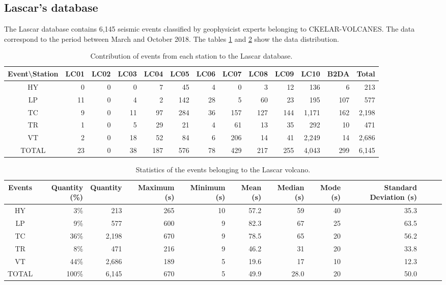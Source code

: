 \documentclass[journal]{IEEEtran}
\begin{document}
\subsection{Lascar's database}
The Lascar database contains 6,145 seismic events classified by geophysicist experts belonging to CKELAR-VOLCANES. The data correspond to the period between March and October 2018. The tables \ref{table:lascar_database} and \ref{table:lascar_statistics} show the data distribution.
\begin{table}
\caption{Contribution of events from each station to the Lascar database.}
\centering
\begin{adjustbox}{width=\textwidth}
\begin{tabular}{crrrrrrrrrrrr}
\hline\hline
Event\textbackslash{}Station & LC01 & LC02 & LC03 & LC04 & LC05 & LC06 & LC07 & LC08 & LC09 & LC10 & B2DA & Total \\
\hline
HY & 0 & 0 & 0 & 7 & 45 & 4 & 0 & 3 & 12 & 136 & 6 & 213 \\
LP & 11 & 0 & 4 & 2 & 142 & 28 & 5 & 60 & 23 & 195 & 107 & 577 \\
TC & 9 & 0 & 11 & 97 & 284 & 36 & 157 & 127 & 144 & 1,171 & 162 & 2,198 \\
TR & 1 & 0 & 5 & 29 & 21 & 4 & 61 & 13 & 35 & 292 & 10 & 471 \\
VT & 2 & 0 & 18 & 52 & 84 & 6 & 206 & 14 & 41 & 2,249 & 14 & 2,686 \\
\hline
TOTAL & 23 & 0 & 38 & 187 & 576 & 78 & 429 & 217 & 255 & 4,043 & 299 & 6,145 \\
\hline
\end{tabular}
\end{adjustbox}
\label{table:lascar_database}
\end{table}

\begin{table}
\caption{Statistics of the events belonging to the Lascar volcano.}
\centering
\begin{tabular}{crrrrrrrrrrr}
\hline\hline
  Events & Quantity (\%) & Quantity & Maximum (s) & Minimum (s) & Mean (s) & Median (s) & Mode (s) & Standard Deviation (s)  \\
\hline
HY & 3\% & 213 & 265 & 10 & 57.2 & 59 & 40 & 35.3 \\
LP & 9\% & 577 & 600 & 9 & 82.3 & 67 & 25 & 63.5 \\
TC & 36\% & 2,198 & 670 & 9 & 78.5 & 65 & 20 & 56.2 \\
TR & 8\% & 471 & 216 & 9 & 46.2 & 31 & 20 & 33.8 \\
VT & 44\% & 2,686 & 189 & 5 & 19.6 & 17 & 10 & 12.3 \\
\hline
TOTAL & 100\% & 6,145 & 670 & 5 & 49.9 & 28.0 & 20 & 50.0 \\
\hline
\end{tabular}
\label{table:lascar_statistics}
\end{table}
\end{document}
